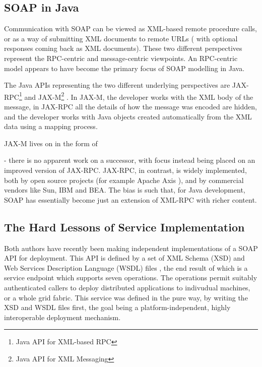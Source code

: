 \subsection{SOAP in Java}
\label{intro:java}

Communication with SOAP can be viewed as XML-based remote procedure
calls, or as a way of submitting XML documents to remote URLs ( with
optional responses coming back as XML documents). These two different
perspectives represent the RPC-centric and message-centric
viewpoints. An RPC-centric model appears to have become the primary
focus of SOAP modelling in Java.

The Java APIs representing the two different underlying perspectives
are JAX-RPC\footnote{Java API for XML-based RPC}
\cite{spec:JAX-RPC-11} and JAX-M\footnote{Java API for XML Messaging}
\cite{spec:JAX-M-11}. In JAX-M, the developer works with the XML body
of the message, in JAX-RPC all the details of how the message was
encoded are hidden, and the developer works with Java objects created
automatically from the XML data using a mapping process.

JAX-M lives on in the form of  

- there is no apparent work on a
successor, with focus instead being placed on an improved version of
JAX-RPC. JAX-RPC, in contrast, is widely implemented, both by open
source projects (for example Apache Axis \cite{axis}), and by
commercial vendors like Sun, IBM and BEA.  The bias is such that, for
Java development, SOAP has essentially become just an extension of
XML-RPC \cite{spec:XML-RPC} with richer content.

\subsection{The Hard Lessons of Service Implementation}
\label{intro:experience}

Both authors have recently been making independent implementations of
a SOAP API for deployment. This API is defined by a set of XML Schema
(XSD)
\cite{spec:XSD}
and Web Services Description Language (WSDL) files \cite{spec:WSDL}
, the end result of which is a service endpoint which
supports seven operations. The operations permit suitably
authenticated callers to deploy distributed applications to indivudual
machines, or a whole grid fabric. This service was defined in the pure
way, by writing the XSD and WSDL files first, the goal being a
platform-independent, highly interoperable deployment mechanism.


